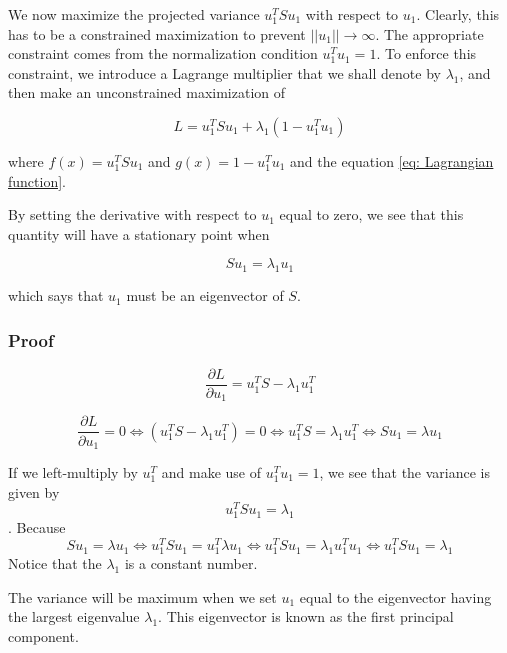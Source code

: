 We now maximize the projected variance $u_1^TSu_1$ with respect to $u_1$. Clearly, this has to be a constrained maximization to prevent $||u_1|| \rightarrow \infty$. The appropriate constraint comes from the normalization condition $u_1^Tu_1=1$. To enforce this constraint, we introduce a Lagrange multiplier that we shall denote by $\lambda_1$, and then make an unconstrained maximization of

\begin{equation}
    \label{eq:PCA_optimize}
    L = u_1^TSu_1 + \lambda_1(1 - u_1^Tu_1)
\end{equation}

where $f(x)=u_1^TSu_1$ and $g(x)=1 - u_1^Tu_1$ and the equation \ref{eq: Lagrangian function}.

By setting the derivative with respect to $u_1$ equal to zero, we see that this quantity will have a stationary point when

\begin{equation}
    \label{eq:PCA_stationary_point}
    Su_1 = \lambda_1u_1
\end{equation}

which says that $u_1$ must be an eigenvector of $S$.

\subsubsection{Proof}
\begin{equation}
    \frac{\partial L}{\partial u_1}=u_1^TS - \lambda_1u_1^T
\end{equation}

$$\frac{\partial L}{\partial u_1} = 0 \Leftrightarrow (u_1^TS - \lambda_1u_1^T)=0 \Leftrightarrow u_1^TS = \lambda_1u_1^T \Leftrightarrow Su_1=\lambda u_1$$

If we left-multiply by $u_1^T$ and make use of $u_1^Tu_1=1$, we see that the variance is given by $$u_1^TSu_1=\lambda_1$$. Because $$Su_1=\lambda u_1 \Leftrightarrow u_1^TSu_1=u_1^T\lambda u_1 \Leftrightarrow u_1^TSu_1=\lambda_1 u_1^T u_1 \Leftrightarrow u_1^TSu_1=\lambda_1$$
Notice that the $\lambda_1$ is a constant number.

The variance will be maximum when we set $u_1$ equal to the eigenvector having the largest eigenvalue $\lambda_1$. This eigenvector is known as the first principal component.

